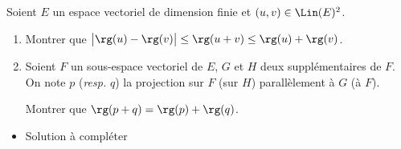\begin{enonce}
\begin{exercise}[ID={RMS134 E569},subtitle={Oral
    Mines-Ponts},theme={algebre},annee={2023},filiere={MP},concours={mines-ponts}, difficulty={0}]
  Soient $E$ un espace vectoriel de dimension finie et
$(u,v)\in\Lin(E)^2$.
\begin{enumerate}
\item Montrer que
  $\big|\rg(u)-\rg(v)\big|\le\rg(u+v)\le\rg(u)+\rg(v)$.
\item Soient $F$ un sous-espace vectoriel de $E$, $G$ et $H$ deux
  supplémentaires de $F$. On note $p$ (\emph{resp.} $q$) la projection
  sur $F$ (sur $H$) parallèlement à $G$ (à $F$).

  Montrer que $\rg(p+q)=\rg(p)+\rg(q)$.
\end{enumerate}
\end{exercise}
\begin{solution}
  \begin{itemize}
  \item Solution à compléter
  \end{itemize}
\end{solution}
\end{enonce}